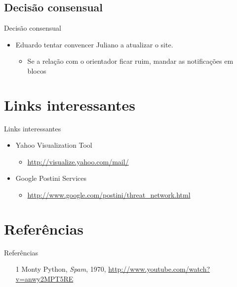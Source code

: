 \documentclass[dvipdfm]{beamer}
\begin{document}
\subsection{Decisão consensual}
\begin{frame}{Decisão consensual}
	\begin{itemize}
		\item Eduardo tentar convencer Juliano a atualizar o site.
		\begin{itemize}
			\item Se a relação com o orientador ficar ruim, mandar as notificações em blocos
		\end{itemize}
	\end{itemize}
\end{frame}


\section{Links interessantes}
\begin{frame}{Links interessantes}

	\begin{itemize}
		\item Yahoo Visualization Tool
		\begin{itemize}
			\item \url{http://visualize.yahoo.com/mail/}
		\end{itemize}
		\item Google Postini Services
		\begin{itemize}
			\item \url{http://www.google.com/postini/threat_network.html}
		\end{itemize}
	\end{itemize}
\end{frame}

\section{Referências}
\begin{frame}{Referências}
	\begin{itemize}
		\item [1] Monty Python, \emph{Spam}, 1970, \url{http://www.youtube.com/watch?v=anwy2MPT5RE} 
	\end{itemize}
\end{frame}
\end{document}
